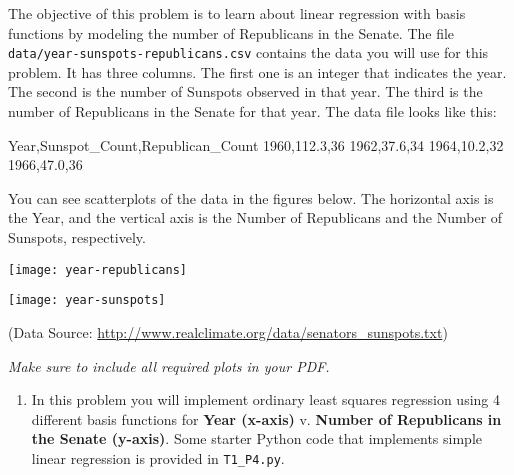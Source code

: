 \documentclass[submit]{harvardml}
\begin{document}

\begin{problem}
  
 The objective of this problem is to learn about linear regression
 with basis functions by modeling the number of Republicans in the
 Senate. The file \verb|data/year-sunspots-republicans.csv| contains the
 data you will use for this problem.  It has three columns.  The first
 one is an integer that indicates the year.  The second is the number
 of Sunspots observed in that year.  The third is the number of Republicans in the Senate for that year.
 The data file looks like this:
 \begin{csv}
Year,Sunspot_Count,Republican_Count
1960,112.3,36
1962,37.6,34
1964,10.2,32
1966,47.0,36
\end{csv}

You can see scatterplots of the data in the figures below.  The horizontal axis is the Year, and the vertical axis is the Number of Republicans and the Number of Sunspots, respectively.

\begin{center}
\texttt{[image: year-republicans]}
\end{center}

\begin{center}
\texttt{[image: year-sunspots]}
\end{center}

(Data Source: \url{http://www.realclimate.org/data/senators_sunspots.txt})\\
\vspace{-5mm}


\vspace{0.5cm}
\noindent\emph{Make sure to include all required plots in your PDF.}

\begin{enumerate}

\item In this problem you will implement ordinary least squares regression using 4 different basis functions for
\textbf{Year (x-axis)} v. \textbf{Number of Republicans in the Senate (y-axis)}. Some starter Python code
that implements simple linear regression is provided in \verb|T1_P4.py|.


\end{enumerate}
\end{problem}
\end{document}
